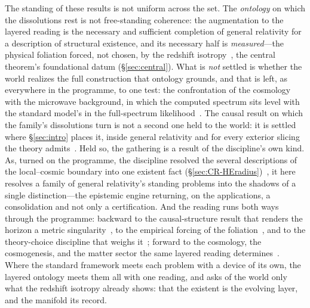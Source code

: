 \documentclass[11pt,a4paper]{article}
\theoremstyle{plain}
\theoremstyle{definition}
\theoremstyle{remark}
\begin{document}
The standing of these results is not uniform across the set. The \emph{ontology} on which the dissolutions rest is not free-standing coherence: the augmentation to the layered reading is the necessary and sufficient completion of general relativity for a description of structural existence, and its necessary half is \emph{measured}---the physical foliation forced, not chosen, by the redshift isotropy~\cite{JanzenModernParallax}, the central theorem's foundational datum (\S\ref{sec:central}). What is \emph{not} settled is whether the world realizes the full construction that ontology grounds, and that is left, as everywhere in the programme, to one test: the confrontation of the cosmology with the microwave background, in which the computed spectrum sits level with the standard model's in the full-spectrum likelihood~\cite{JanzenCRcosmology}. The causal result on which the family's dissolutions turn is not a second one held to the world: it is settled where \S\ref{sec:intro} places it, inside general relativity and for every exterior slicing the theory admits~\cite{JanzenBHcausality}. Held so, the gathering is a result of the discipline's own kind. As, turned on the programme, the discipline resolved the several descriptions of the local--cosmic boundary into one existent fact (\S\ref{sec:CR-HEradius})~\cite{JanzenShadowExistence}, it here resolves a family of general relativity's standing problems into the shadows of a single distinction---the epistemic engine returning, on the applications, a consolidation and not only a certification. And the reading runs both ways through the programme: backward to the causal-structure result that renders the horizon a metric singularity~\cite{JanzenBHcausality}, to the empirical forcing of the foliation~\cite{JanzenModernParallax}, and to the theory-choice discipline that weighs it~\cite{JanzenShadowExistence}; forward to the cosmology, the cosmogenesis, and the matter sector the same layered reading determines~\cite{JanzenCRcosmology,JanzenCosmogenesis,JanzenMatter}. Where the standard framework meets each problem with a device of its own, the layered ontology meets them all with one reading, and asks of the world only what the redshift isotropy already shows: that the existent is the evolving layer, and the manifold its record.
\end{document}
